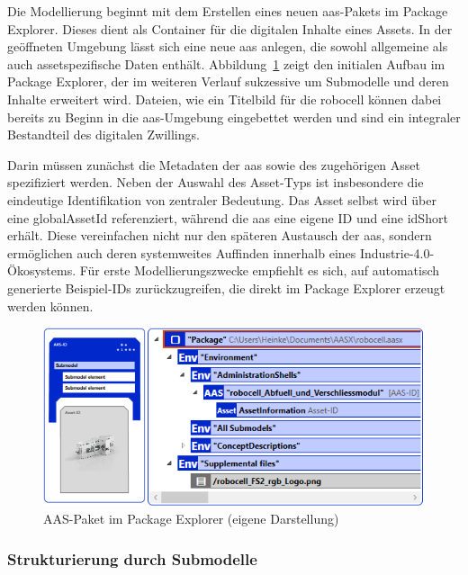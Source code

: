 Die Modellierung beginnt mit dem Erstellen eines neuen \acs{aas}-Pakets im Package Explorer.
Dieses dient als Container für die digitalen Inhalte eines Assets.  
In der geöffneten Umgebung lässt sich eine neue \acs{aas} anlegen, die sowohl allgemeine als auch assetspezifische Daten enthält. 
Abbildung~\ref{fig:NeuesAASPaket} zeigt den initialen Aufbau im Package Explorer, der im weiteren Verlauf sukzessive um Submodelle und deren Inhalte erweitert wird.
Dateien, wie ein Titelbild für die robocell können dabei bereits zu Beginn in die \acs{aas}-Umgebung eingebettet werden und sind ein integraler Bestandteil des digitalen Zwillings.

Darin müssen zunächst die Metadaten der \acs{aas} sowie des zugehörigen Asset spezifiziert werden.
Neben der Auswahl des Asset-Typs ist insbesondere die eindeutige Identifikation von zentraler Bedeutung.
Das Asset selbst wird über eine globalAssetId referenziert, während die \acs{aas} eine eigene ID und eine idShort erhält.
Diese vereinfachen nicht nur den späteren Austausch der \acs{aas}, sondern ermöglichen auch deren systemweites Auffinden innerhalb eines Industrie-4.0-Ökosystems.
Für erste Modellierungszwecke empfiehlt es sich, auf automatisch generierte Beispiel-IDs zurückzugreifen, die direkt im Package Explorer erzeugt werden können.

\begin{figure}[htbp]
    \centering
    \includegraphics{Bilder/ModellierungAAS/Final/NeuesAASPaket.PNG}
    \caption[AAS-Paket im Package Explorer]{AAS-Paket im Package Explorer (eigene Darstellung)}
    \label{fig:NeuesAASPaket}
\end{figure}


\subsubsection*{Strukturierung durch Submodelle}
\vspace{-0.5em}

